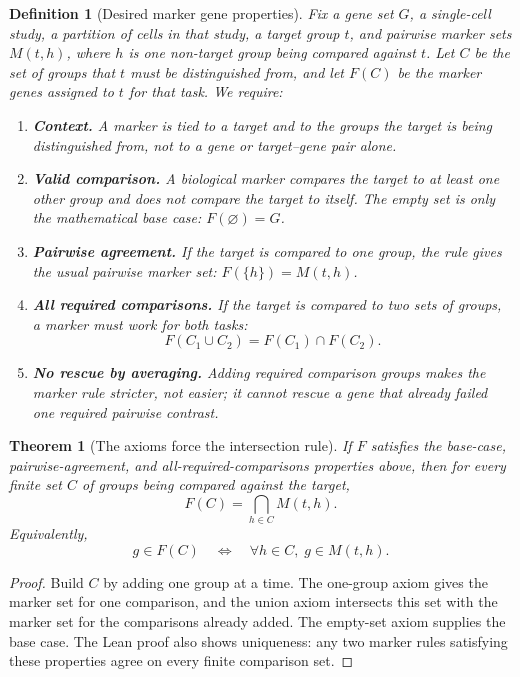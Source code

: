 \documentclass{article}
\newtheorem{definition}{Definition}
\newtheorem{theorem}{Theorem}
\begin{document}
\begin{definition}[Desired marker gene properties]\label{def:marker-family-axioms}
\normalfont
Fix a gene set $G$, a single-cell study, a partition of cells in that study, a target group $t$, and pairwise marker sets $M(t,h)$, where $h$ is one non-target group being compared against $t$. Let $C$ be the set of groups that $t$ must be distinguished from, and let $F(C)$ be the marker genes assigned to $t$ for that task. We require:
\begin{enumerate}
  \item \textbf{Context.} A marker is tied to a target and to the groups the target is being distinguished from, not to a gene or target--gene pair alone.
  \item \textbf{Valid comparison.} A biological marker compares the target to at least one other group and does not compare the target to itself. The empty set is only the mathematical base case: $F(\varnothing)=G$.
  \item \textbf{Pairwise agreement.} If the target is compared to one group, the rule gives the usual pairwise marker set: $F(\{h\})=M(t,h)$.
  \item \textbf{All required comparisons.} If the target is compared to two sets of groups, a marker must work for both tasks:
\[
  F(C_1\cup C_2)=F(C_1)\cap F(C_2).
\]
  \item \textbf{No rescue by averaging.} Adding required comparison groups makes the marker rule stricter, not easier; it cannot rescue a gene that already failed one required pairwise contrast.
\end{enumerate}
\end{definition}

\begin{theorem}[The axioms force the intersection rule]\label{thm:marker-axiom-representation}
If $F$ satisfies the base-case, pairwise-agreement, and all-required-comparisons properties above, then for every finite set $C$ of groups being compared against the target,
\[
  F(C)=\bigcap_{h\in C}M(t,h).
\]
Equivalently,
\[
  g\in F(C)
  \quad\Longleftrightarrow\quad
  \forall h\in C,\; g\in M(t,h).
\]
\end{theorem}

\begin{proof}
Build $C$ by adding one group at a time. The one-group axiom gives the marker set for one comparison, and the union axiom intersects this set with the marker set for the comparisons already added. The empty-set axiom supplies the base case. The Lean proof also shows uniqueness: any two marker rules satisfying these properties agree on every finite comparison set.
\end{proof}
\end{document}
